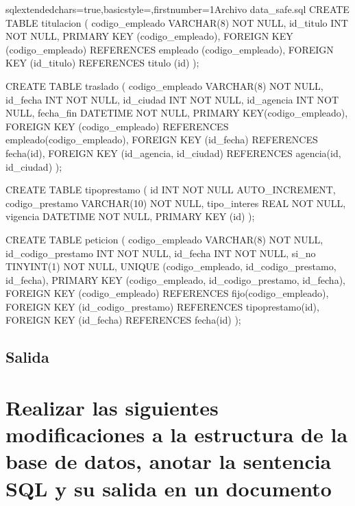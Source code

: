 \begin{sourcecodep}[]{sql}{extendedchars=true,basicstyle={\fontsize{10}{10}\selectfont\ttfamily},firstnumber=1}{Archivo data\_safe.sql}
		CREATE TABLE titulacion (
		codigo_empleado VARCHAR(8) NOT NULL,
		id_titulo INT NOT NULL,
		PRIMARY KEY (codigo_empleado),
		FOREIGN KEY (codigo_empleado) REFERENCES empleado (codigo_empleado),
		FOREIGN KEY (id_titulo) REFERENCES titulo (id) );
		
		CREATE TABLE traslado (
		codigo_empleado VARCHAR(8) NOT NULL,
		id_fecha INT NOT NULL,
		id_ciudad INT NOT NULL,
		id_agencia INT NOT NULL,
		fecha_fin DATETIME NOT NULL,
		PRIMARY KEY(codigo_empleado),
		FOREIGN KEY (codigo_empleado) REFERENCES empleado(codigo_empleado),
		FOREIGN KEY (id_fecha) REFERENCES fecha(id),
		FOREIGN KEY (id_agencia, id_ciudad) REFERENCES agencia(id, id_ciudad) );
		
		CREATE TABLE tipoprestamo (
		id INT NOT NULL AUTO_INCREMENT,
		codigo_prestamo VARCHAR(10) NOT NULL,
		tipo_interes REAL NOT NULL,
		vigencia DATETIME NOT NULL,
		PRIMARY KEY (id) ); 
		
		CREATE TABLE peticion (
		codigo_empleado VARCHAR(8) NOT NULL,
		id_codigo_prestamo INT NOT NULL,
		id_fecha INT NOT NULL, 
		si_no TINYINT(1) NOT NULL,
		UNIQUE (codigo_empleado, id_codigo_prestamo, id_fecha),
		PRIMARY KEY (codigo_empleado, id_codigo_prestamo, id_fecha),
		FOREIGN KEY (codigo_empleado) REFERENCES fijo(codigo_empleado),
		FOREIGN KEY (id_codigo_prestamo) REFERENCES tipoprestamo(id),
		FOREIGN KEY (id_fecha) REFERENCES fecha(id) );\end{sourcecodep}
		\subsection{Salida}
		
\newpage
\section{Realizar las siguientes modificaciones a la estructura de la base de datos, anotar la sentencia SQL y su salida en un documento}
